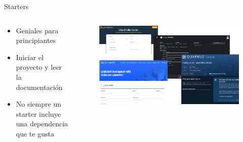 \documentclass[aspectratio=169]{beamer}
\begin{document}
\begin{frame}{Starters}

\begin{columns}[T] %
\begin{column}[T]{4cm} %
        \begin{itemize}
            \item Geniales para principiantes
           \item Iniciar el proyecto y leer la documentación
           \item No siempre un starter incluye una dependencia que te gusta
        \end{itemize}
\end{column}
\begin{column}[T]{10cm} %

\begin{figure}
        \centering
        \includegraphics[width=\linewidth]{Images/starters.png}
        \label{fig:starters}
    \end{figure}
\end{column}
\end{columns}
\end{frame}
\end{document}
